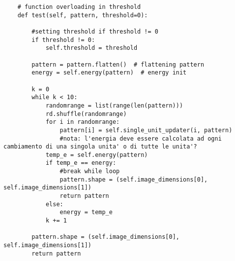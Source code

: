 \documentclass[letterpaper,twocolumn,10pt]{article}
\begin{document}
\begin{lstlisting}
    # function overloading in threshold
    def test(self, pattern, threshold=0):

        #setting threshold if threshold != 0
        if threshold != 0:
            self.threshold = threshold

        pattern = pattern.flatten()  # flattening pattern
        energy = self.energy(pattern)  # energy init

        k = 0
        while k < 10:
            randomrange = list(range(len(pattern)))
            rd.shuffle(randomrange)
            for i in randomrange:
                pattern[i] = self.single_unit_updater(i, pattern)
                #nota: l'energia deve essere calcolata ad ogni cambiamento di una singola unita' o di tutte le unita'?
            temp_e = self.energy(pattern)
            if temp_e == energy:
                #break while loop
                pattern.shape = (self.image_dimensions[0], self.image_dimensions[1])
                return pattern
            else:
                energy = temp_e
            k += 1

        pattern.shape = (self.image_dimensions[0], self.image_dimensions[1])
        return pattern
\end{lstlisting}

\clearpage
\end{document}
